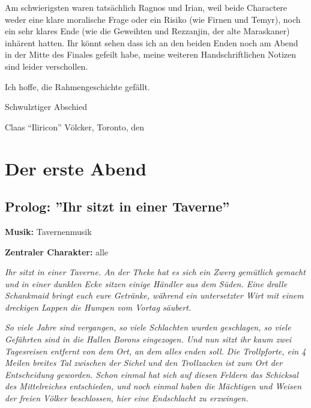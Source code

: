 Am schwierigsten waren tatsächlich Ragnos und Irian, weil beide Charactere weder eine klare moralische Frage oder ein Risiko (wie Firnen und Temyr), noch ein sehr klares Ende (wie die Geweihten und Rezzanjin, der alte Maraskaner) inhärent hatten.
Ihr könnt sehen dass ich an den beiden Enden noch am Abend in der Mitte des Finales gefeilt habe, meine weiteren Handschriftlichen Notizen sind leider verschollen.


Ich hoffe, die Rahmengeschichte gefällt.

Schwulztiger Abschied

\begin{flushright}
Claas ``Iliricon'' Völcker, Toronto, den 
\end{flushright}

% 

\section{Der erste Abend}

\subsection{Prolog: ''Ihr sitzt in einer Taverne''}

\textbf{Musik:} Tavernenmusik

\textbf{Zentraler Charakter:} alle

\emph{Ihr sitzt in einer Taverne. An der Theke hat es sich ein Zwerg gemütlich gemacht und in einer dunklen Ecke sitzen einige Händler aus dem Süden. Eine dralle Schankmaid bringt euch eure Getränke, während ein untersetzter Wirt mit einem dreckigen Lappen die Humpen vom Vortag säubert.}

\emph{So viele Jahre sind vergangen, so viele Schlachten wurden geschlagen, so viele Gefährten sind in die Hallen Borons eingezogen. Und nun sitzt ihr kaum zwei Tagesreisen entfernt von dem Ort, an dem alles enden soll. Die Trollpforte, ein 4 Meilen breites Tal zwischen der Sichel und den Trollzacken ist zum Ort der Entscheidung geworden. Schon einmal hat sich auf diesen Feldern das Schicksal des Mittelreiches entschieden, und noch einmal haben die Mächtigen und Weisen der freien Völker beschlossen, hier eine Endschlacht zu erzwingen.} 

